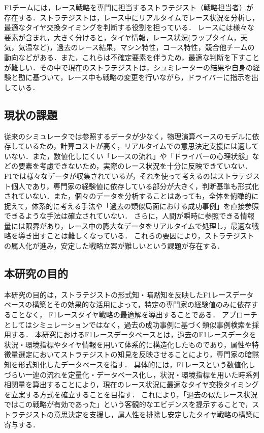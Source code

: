 \documentclass{deimj}
\begin{document}
F1チームには，レース戦略を専門に担当するストラテジスト（戦略担当者）が存在する．ストラテジストは，レース中にリアルタイムでレース状況を分析し，最適なタイヤ交換タイミングを判断する役割を担っている．
レースには様々な要素が含まれ，大きく分けると，タイヤ情報，レース状況(ラップタイム，天気，気温など)，過去のレース結果，マシン特性，コース特性，競合他チームの動向などがある．また，これらは不確定要素を伴うため，最適な判断を下すことが難しい．その中で現在のストラテジストは，シュミレーターの結果や自身の経験と勘に基づいて，レース中も戦略の変更を行いながら，ドライバーに指示を出している．

\subsection{現状の課題}

従来のシミュレータでは参照するデータが少なく，物理演算ベースのモデルに依存しているため，計算コストが高く，リアルタイムでの意思決定支援には適していない．また，数値化しにくい「レースの流れ」や「ドライバーの心理状態」などの要素を考慮できないため，実際のレース状況を十分に反映できていない．
F1では様々なデータが収集されているが，それを使って考えるのはストラテジスト個人であり，専門家の経験値に依存している部分が大きく，判断基準も形式化されていない．また，個々のデータを分析することはあっても，全体を俯瞰的に捉えて，体系的に考える手法や「過去の類似局面における成功事例」を直接参照できるような手法は確立されていない．
さらに，人間が瞬時に参照できる情報量には限界があり，レース中の膨大なデータをリアルタイムで処理し，最適な戦略を導き出すことは難しくなっている．
これらの要因により，ストラテジストの属人化が進み，安定した戦略立案が難しいという課題が存在する．


\subsection{本研究の目的}

本研究の目的は，ストラテジストの形式知・暗黙知を反映したF1レースデータベースの構築とその効果的な活用によって，特定の専門家の経験値のみに依存することなく， F1レースタイヤ戦略の最適解を導出することである．
アプローチとしてはシミュレーションではなく，過去の成功事例に基づく類似事例検索を採用する．
本研究におけるF1レースデータベースとは，過去のF1レースデータを状況・環境指標やタイヤ情報を用いて体系的に構造化したものであり，属性や特徴量選定においてストラテジストの知見を反映させることにより，専門家の暗黙知を形式知化したデータベースを指す．
具体的には，F1レースという数値化しづらい一連の流れを定量化・データベース化し，状況・環境指標を用いた時系列相関量を算出することにより，現在のレース状況に最適なタイヤ交換タイミングを立案する方式を確立することを目指す．
これにより，「過去の似たレース状況ではこの戦略が有効であった」という客観的なエビデンスを提示することで，ストラテジストの意思決定を支援し，属人性を排除し安定したタイヤ戦略の構築に寄与する．
\end{document}
